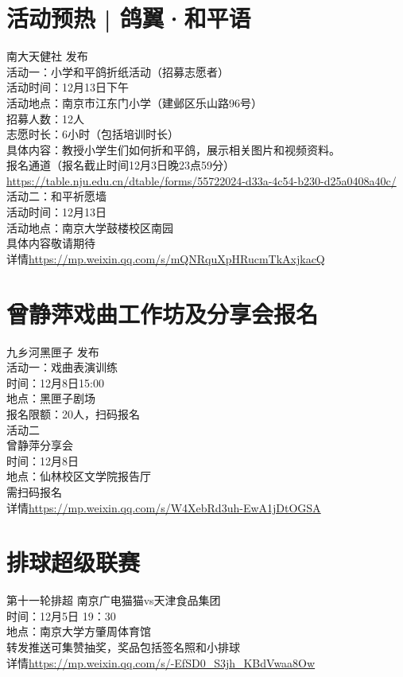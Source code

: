 \documentclass[letterpaper, 12pt]{article}
\begin{document}
\begin{multicols}{2}
\section{活动预热 | 鸽翼·和平语}
南大天健社 发布\\
活动一：小学和平鸽折纸活动（招募志愿者）\\
活动时间：12月13日下午\\
活动地点：南京市江东门小学（建邺区乐山路96号）\\
招募人数：12人\\
志愿时长：6小时（包括培训时长）\\
具体内容：教授小学生们如何折和平鸽，展示相关图片和视频资料。\\
报名通道（报名截止时间12月3日晚23点59分）\url{https://table.nju.edu.cn/dtable/forms/55722024-d33a-4c54-b230-d25a0408a40c/}\\
活动二：和平祈愿墙\\
活动时间：12月13日\\
活动地点：南京大学鼓楼校区南园\\
具体内容敬请期待\\
详情\url{https://mp.weixin.qq.com/s/mQNRquXpHRucmTkAxjkacQ}\\

\section{曾静萍戏曲工作坊及分享会报名}
九乡河黑匣子 发布\\
活动一：戏曲表演训练\\
时间：12月8日15:00\\
地点：黑匣子剧场\\
报名限额：20人，扫码报名\\
活动二\\
曾静萍分享会\\
时间：12月8日\\
地点：仙林校区文学院报告厅\\
需扫码报名\\
详情\url{https://mp.weixin.qq.com/s/W4XebRd3uh-EwA1jDtOGSA}\\


\section{排球超级联赛}
第十一轮排超 南京广电猫猫vs天津食品集团\\
时间：12月5日 19：30\\
地点：南京大学方肇周体育馆\\
转发推送可集赞抽奖，奖品包括签名照和小排球\\
详情\url{https://mp.weixin.qq.com/s/-EfSD0_S3jh_KBdVwaa8Ow}\\

\end{multicols}
\end{document}

